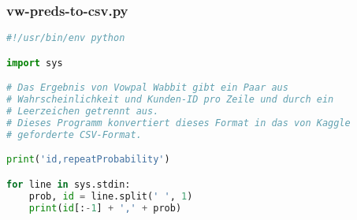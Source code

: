 \subsubsection{vw-preds-to-csv.py}
\label{code:vw-preds-to-csv}
\begin{lstlisting}[language=Python]
#!/usr/bin/env python

import sys

# Das Ergebnis von Vowpal Wabbit gibt ein Paar aus 
# Wahrscheinlichkeit und Kunden-ID pro Zeile und durch ein
# Leerzeichen getrennt aus.
# Dieses Programm konvertiert dieses Format in das von Kaggle
# geforderte CSV-Format.

print('id,repeatProbability')

for line in sys.stdin:
	prob, id = line.split(' ', 1)
	print(id[:-1] + ',' + prob)
\end{lstlisting}
	
	
